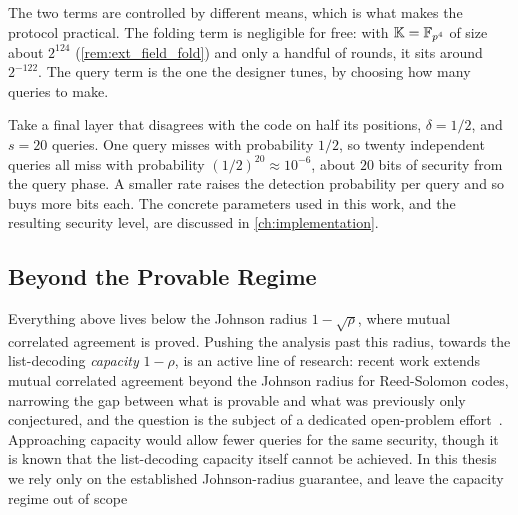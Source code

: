 The two terms are controlled by different means, which is what makes the
protocol practical. The folding term is negligible for free: with
$\mathbb{K} = \mathbb{F}_{p^4}$ of size about $2^{124}$ (\cref{rem:ext_field_fold})
and only a handful of rounds, it sits around $2^{-122}$. The query term is
the one the designer tunes, by choosing how many queries to make.

\begin{example}
\label{ex:query_soundness}
Take a final layer that disagrees with the code on half its positions,
$\delta = 1/2$, and $s = 20$ queries. One query misses with probability
$1/2$, so twenty independent queries all miss with probability
$(1/2)^{20} \approx 10^{-6}$, about $20$ bits of security from the query
phase. A smaller rate raises the detection probability per query and so
buys more bits each. The concrete parameters used in this work, and the
resulting security level, are discussed in \cref{ch:implementation}.
\end{example}


\subsection{Beyond the Provable Regime}
\label{subsec:regimes}

Everything above lives below the Johnson radius $1 - \sqrt{\rho}$, where
mutual correlated agreement is proved. Pushing the analysis past this
radius, towards the list-decoding \emph{capacity} $1 - \rho$, is an active
line of research: recent work extends mutual correlated agreement beyond
the Johnson radius for Reed-Solomon codes, narrowing the gap between what
is provable and what was previously only conjectured, and the question is
the subject of a dedicated open-problem effort~\cite{proximityprize}.
Approaching capacity would allow fewer queries for the same security, though 
it is known that the list-decoding capacity itself cannot be achieved. In this 
thesis we rely only on the established Johnson-radius guarantee, and leave 
the capacity regime out of scope

